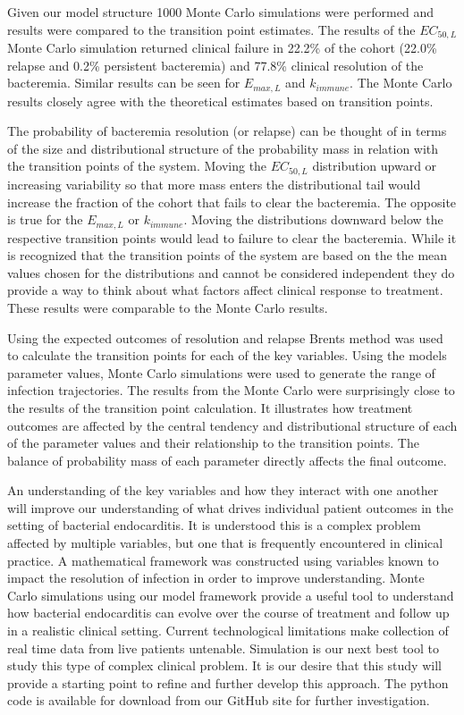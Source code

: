 \documentclass[utf8]{FrontiersinHarvard} %
\begin{document}
Given our model structure 1000 Monte Carlo simulations were performed and results were compared to the transition point estimates.  The results of the $EC_{50,L}$ Monte Carlo simulation returned clinical failure in 22.2\% of the cohort (22.0\% relapse and 0.2\% persistent bacteremia) and 77.8\% clinical resolution of the bacteremia.  Similar results can be seen for $E_{max,L}$ and $k_{immune}$.  The Monte Carlo results closely agree with the theoretical estimates based on transition points.

The probability of bacteremia resolution (or relapse) can be thought of in terms of the size and distributional structure of the probability mass in relation with the transition points of the system.  Moving the $EC_{50,L}$ distribution upward or increasing variability so that more mass enters the distributional tail would increase the fraction of the cohort that fails to clear the bacteremia.  The opposite is true for the $E_{max,L}$ or $k_{immune}$.  Moving the distributions downward below the respective transition points would lead to failure to clear the bacteremia.  While it is recognized that the transition points of the system are based on the the mean values chosen for the distributions and cannot be considered independent they do provide a way to think about what factors affect clinical response to treatment.  These results were comparable to the Monte Carlo results.

Using the expected outcomes of resolution and relapse Brents method was used to calculate the transition points for each of the key variables.  Using the models parameter values, Monte Carlo simulations were used to generate the range of infection trajectories.  The results from the Monte Carlo were surprisingly close to the results of the transition point calculation.  It illustrates how treatment outcomes are affected by the central tendency and distributional structure of each of the parameter values and their relationship to the transition points.  The balance of probability mass of each parameter directly affects the final outcome.

An understanding of the key variables and how they interact with one another will improve our understanding of what drives individual patient outcomes in the setting of bacterial endocarditis.  It is understood this is a complex problem affected by multiple variables, but one that is frequently encountered in clinical practice.  A mathematical framework was constructed using variables known to impact the resolution of infection in order to improve understanding.  Monte Carlo simulations using our model framework provide a useful tool to understand how bacterial endocarditis can evolve over the course of treatment and follow up in a realistic clinical setting.   Current technological limitations make collection of real time data from live patients untenable.  Simulation is our next best tool to study this type of complex clinical problem. It is our desire that this study will provide a starting point to refine and further develop this approach.  The python code is available for download from our GitHub site for further investigation.
\end{document}
